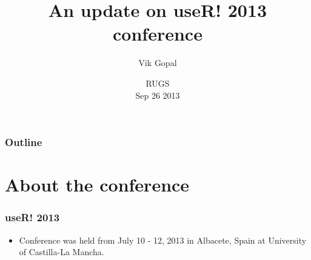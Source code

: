 \documentclass{beamer}
\title[useR! 2013] %
{An update on useR! 2013 conference}
\author %
{Vik Gopal}
\date %
{RUGS\\Sep 26 2013}
\begin{document}
\begin{frame}
  \titlepage
\end{frame}

\begin{frame}
  \frametitle{Outline}
  \tableofcontents
\end{frame}





\section{About the conference}
\begin{frame}[t]
  \frametitle{useR! 2013}
\begin{itemize}
  \item Conference was held from July 10 - 12, 2013 in Albacete, Spain at
    University of Castilla-La Mancha.
\end{itemize}
\begin{center}
\end{center}
\begin{center}
\end{center}
\end{frame}
\end{document}
